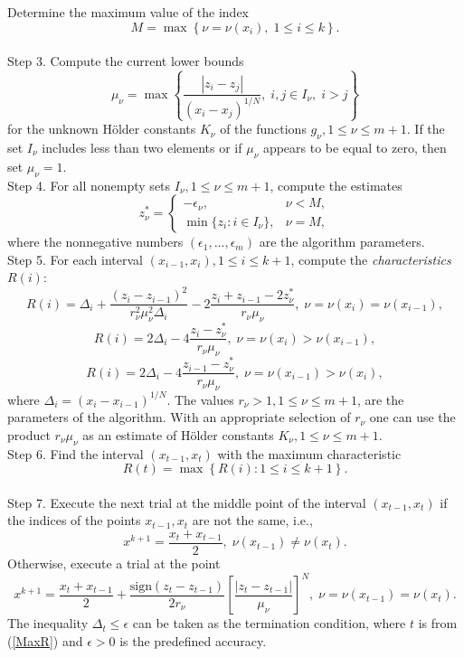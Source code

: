 \documentclass[preprint]{elsarticle}
\begin{document}
	Determine the maximum value of the index 
$$
	M=\max\left\{\nu=\nu(x_i), \; 1 \leq i \leq k \right \}.
$$ \\
Step 3. Compute the current lower bounds
\begin{equation}\label{current_lower_bounds}
	\mu_{\nu} = \max\left\{ \frac{\left|z_i-z_j\right|}{ (x_i - x_j)^{1/N} }, \; i,j \in I_\nu, \; i>j \right\}
\end{equation}
for the unknown H\"{o}lder constants $K_{\nu}$ of the functions $g_{\nu}, 1 \leq \nu \leq m+1$. If the set $I_{\nu}$ includes less than two elements or if $\mu_{\nu}$ appears to be equal to zero, then set $\mu_{\nu}=1$. \\
Step 4. For all nonempty sets $I_{\nu}, 1 \leq \nu \leq m+1$, compute the estimates
\begin{equation}\label{z_estimates}
	z_\nu^\ast = \left\{
   \begin{array}{lr}
     -\epsilon_\nu, & \nu < M,\\
     \min\{ z_i: i\in I_\nu \}, & \nu = M,
   \end{array}
	\right.
\end{equation}
where the nonnegative numbers $(\epsilon_1,\ldots,\epsilon_m )$ are the algorithm parameters. \\
Step 5. For each interval $(x_{i-1}, x_i), 1 \leq i \leq k+1$, compute the \textit{characteristics} $R(i)$:
\begin{equation}\label{R_1}
	R(i)=\Delta_i+\frac{(z_i-z_{i-1})^2}{r_\nu^2 \mu_\nu^2\Delta_i}-2\frac{z_i+z_{i-1}-2z_\nu^\ast}{r_\nu \mu_\nu}, \;  \nu=\nu(x_i)=\nu(x_{i-1}),
\end{equation}
\begin{equation}\label{R_2}
	R(i)=2\Delta_i-4\frac{z_i-z_\nu^\ast}{r_\nu \mu_\nu}, \; \nu=\nu(x_i)>\nu(x_{i-1}),
\end{equation}
\begin{equation}\label{R_3}
R(i)=2\Delta_i-4\frac{z_{i-1}-z_\nu^\ast}{r_\nu \mu_\nu}, \; \nu=\nu(x_{i-1})>\nu(x_i),
\end{equation}
where $\Delta_i=(x_i-x_{i-1})^{1/N}$. The values $r_{\nu} > 1, 1 \leq \nu \leq m+1$, are the parameters of the algorithm. With an appropriate selection of $r_{\nu}$ one can use the product $r_{\nu}\mu_{\nu}$ as an estimate of H\"{o}lder constants $K_{\nu}, 1 \leq \nu \leq m+1$. \\
Step 6. Find the interval $(x_{t-1}, x_t)$ with the maximum characteristic
\begin{equation}\label{MaxR}
	R(t)=\max{\left\{R(i): 1 \leq i \leq k+1\right\}}.
\end{equation} \\
Step 7. Execute the next trial at the middle point of the interval $(x_{t-1}, x_t)$ if the indices of the points $x_{t-1}, x_t$ are not the same, i.e.,
$$
	x^{k+1} = \frac{x_t + x_{t-1}}{2}, \; \nu(x_{t-1}) \neq \nu(x_t).
$$
Otherwise, execute a trial at the point
$$
	x^{k+1} = \frac{x_t+x_{t-1}}{2} + \frac{\mathrm{sign}(z_t-z_{t-1})}{2r_\nu}\left[\frac{\left|z_t-z_{t-1}\right|}{\mu_\nu}\right]^N, \; \nu=\nu(x_{t-1})=\nu(x_t).
$$
The inequality $\Delta_t \leq \epsilon$ can be taken as the termination condition, where $t$ is from (\ref{MaxR}) and $\epsilon>0$ is the predefined accuracy.
\end{document}
